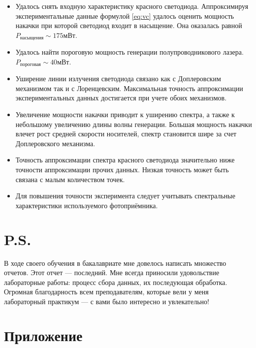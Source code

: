 \documentclass[a4paper, 12pt]{extarticle}
\begin{document}
\begin{itemize}
    \item Удалось снять входную характеристику красного светодиода. Аппроксимируя экспериментальные данные формулой \ref{eq:vc} удалось оценить мощность накачки при которой светодиод входит в насыщение. Она оказалась равной $P_{\text{насыщения}} \sim 175$мВт.
    \item Удалось найти пороговую мощность генерации полупроводникового лазера. $P_{\text{пороговая}} \sim 40 мВт$.
    \item Уширение линии излучения светодиода связано как с Доплеровским механизмом так и с Лоренцевским. Максимальная точность аппроксимации экспериментальных данных достигается при учете обоих механизмов.
    \item Увеличение мощности накачки приводит к уширению спектра, а также к небольшому увеличению длины волны генерации. Большая мощность накачки влечет рост средней скорости носителей, спектр становится шире за счет Доплеровского механизма.
    \item Точность аппроксимации спектра красного светодиода значительно ниже точности аппроксимации прочих данных. Низкая точность может быть связана с малым количеством точек. 
    \item Для повышения точности эксперимента следует учитывать спектральные характеристики используемого фотоприёмника.
\end{itemize}



\section*{\textcolor{header}{P.S.}}
В ходе своего обучения в бакалавриате мне довелось написать множество отчетов. Этот отчет — последний. Мне всегда приносили удовольствие лабораторные работы: процесс сбора данных, их последующая обработка. Огромная благодарность всем преподавателям, которые вели у меня лабораторный практикум — с вами было интересно и увлекательно!




\section*{\textcolor{header}{Приложение}}
\end{document}
